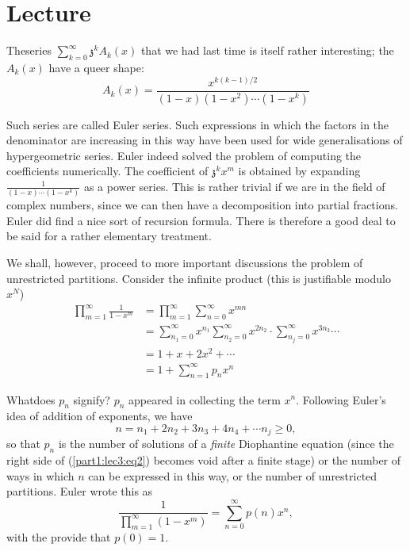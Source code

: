 \chapter{Lecture}\label{part1:lec3}

The\pageoriginale  series $\sum\limits^\infty_{k=0} \mathfrak{z}^k A_k (x)$ that we
had last time is itself rather interesting; the $A_k (x)$ have a queer
shape:
$$
A_k (x) = \frac{x^{k(k-1)/2}}{(1-x)(1-x^2)\cdots (1-x^k)}
$$

Such series are called Euler series. Such expressions in which the
factors in the denominator are increasing in this way have been used
for wide generalisations of hypergeometric series. Euler indeed solved
the problem of computing the coefficients numerically. The coefficient
of $\mathfrak{z}^k x^m$ is obtained by expanding $\frac{1}{(1-x)\cdots
  (1-x^k)}$ as a power series. This is rather trivial if we are in the
field of complex numbers, since we can then have a decomposition into
partial fractions. Euler did find a nice sort of recursion
formula. There is therefore a good deal to be said for a rather
elementary treatment.

We shall, however, proceed to more important discussions the problem
of unrestricted partitions. Consider the infinite product (this is
justifiable modulo $x^N$)
\begin{align*}
  \prod^\infty_{m=1} \frac{1}{1-x^m} & = \prod^\infty_{m=1}
  \sum^\infty_{n=0} x^{mn}\\
  & = \sum^\infty_{n_1=0} x^{n_1} \sum^\infty_{n_2=0} x^{2n_2}\cdot 
  \sum^\infty_{n_j=0} x^{3n_3} \cdots\\
  & = 1+ x+2x^2 + \cdots \\
  & = 1 + \sum^\infty_{n=1} p_n x^n \tag{1}\label{part1:lec3:eq1}
\end{align*}

What\pageoriginale  does $p_n$ signify? $p_n$ appeared in collecting the term
$x^n$. Following Euler's idea of addition of exponents, we have
\begin{equation*}
  n=n_1+ 2n_2+ 3n_3+ 4n_4 + \cdots n_j \geq 0, \tag{2}\label{part1:lec3:eq2}
\end{equation*}
so that $p_n$ is the number of solutions of a \textit{finite}
Diophantine equation (since the right side of (\ref{part1:lec3:eq2}) becomes void after a
finite stage) or the number of ways in which $n$ can be expressed in
this way, or the number of unrestricted partitions. Euler wrote this
as 
\begin{equation*}
  \frac{1}{\prod^\infty_{m=1} (1- x^m)} = \sum^\infty_{n=0} p(n) x^n,
  \tag{3}\label{part1:lec3:eq3} 
\end{equation*}
with the provide that $p(0)=1$.

